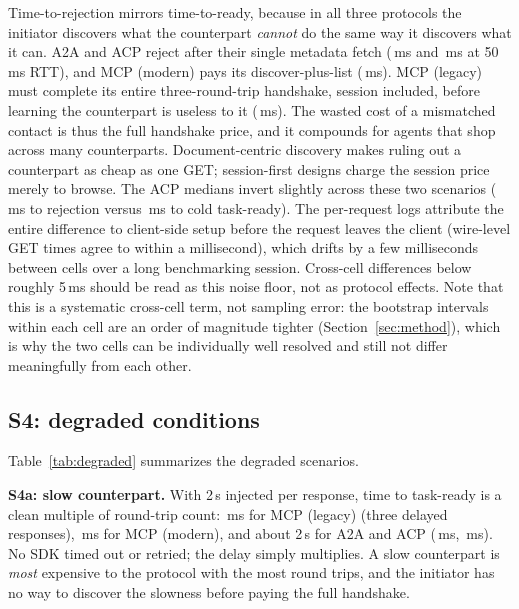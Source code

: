 \documentclass[10pt]{article}
\newcommand{\mcpl}{MCP (legacy)}
\newcommand{\mcpm}{MCP (modern)}
\begin{document}
Time-to-rejection mirrors time-to-ready, because in all three protocols
the initiator discovers what the counterpart \emph{cannot} do the same
way it discovers what it can. A2A and ACP reject after their single
metadata fetch (\SThreeAtoaRttMed{}\,ms and \SThreeAcpRttMed{}\,ms at
50\,ms RTT), and \mcpm{} pays its discover-plus-list
(\SThreeMcpModernRttMed{}\,ms). \mcpl{} must complete its entire
three-round-trip handshake, session included, before learning the
counterpart is useless to it (\SThreeMcpLegacyRttMed{}\,ms). The wasted
cost of a mismatched contact is thus the full handshake price, and it
compounds for agents that shop across many counterparts.
Document-centric discovery makes ruling out a counterpart as cheap as one
GET; session-first designs charge the session price merely to browse. The
ACP medians invert slightly across these two scenarios
(\SThreeAcpRttMed{}\,ms to rejection versus \SOneAcpRttMed{}\,ms to cold
task-ready). The per-request logs attribute the entire difference to
client-side setup before the request leaves the client (wire-level GET
times agree to within a millisecond), which drifts by a few milliseconds
between cells over a long benchmarking session. Cross-cell differences
below roughly 5\,ms should be read as this noise floor, not as protocol
effects. Note that this is a systematic cross-cell term, not sampling
error: the bootstrap intervals within each cell are an order of magnitude
tighter (Section~\ref{sec:method}), which is why the two cells can be
individually well resolved and still not differ meaningfully from each
other.

\subsection{S4: degraded conditions}

\begin{table}[t]
\centering
\footnotesize\setlength{\tabcolsep}{4pt}
\caption{Behavior under degraded conditions ($N{=}\NRuns$ per cell,
localhost). S4a reports time to task-ready with a 2\,s per-response
server delay; S4b/S4c report time to failure. Retr.\ = client retries
observed (duplicate requests). For S4c, ACP is untestable: its manifest
carries no protocol-version field.}
\label{tab:degraded}

\end{table}

Table~\ref{tab:degraded} summarizes the degraded scenarios.

\textbf{S4a: slow counterpart.} With 2\,s injected per response, time to
task-ready is a clean multiple of round-trip count:
\SFourAMcpLegacyLocalMed{}\,ms for \mcpl{} (three delayed responses),
\SFourAMcpModernLocalMed{}\,ms for \mcpm{}, and about 2\,s for A2A and
ACP (\SFourAAtoaLocalMed{}\,ms, \SFourAAcpLocalMed{}\,ms). No SDK timed
out or retried; the delay simply multiplies. A slow counterpart is
\emph{most} expensive to the protocol with the most round trips, and the
initiator has no way to discover the slowness before paying the full
handshake.
\end{document}
